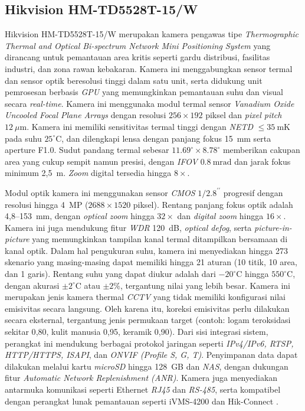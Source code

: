 \subsection{Hikvision HM-TD5528T-15/W}
Hikvision HM-TD5528T-15/W merupakan kamera pengawas tipe \emph{Thermographic Thermal and Optical Bi-spectrum Network Mini Positioning System} yang dirancang untuk pemantauan area kritis seperti gardu distribusi, fasilitas industri, dan zona rawan kebakaran. Kamera ini menggabungkan sensor termal dan sensor optik beresolusi tinggi dalam satu unit, serta didukung unit pemrosesan berbasis \emph{GPU} yang memungkinkan pemantauan suhu dan visual secara \emph{real-time}. Kamera ini menggunaka modul termal sensor \emph{Vanadium Oxide Uncooled Focal Plane Arrays} dengan resolusi \(256 \times 192\) piksel dan \emph{pixel pitch} \(12~\mu\text{m}\). Kamera ini memiliki sensitivitas termal tinggi dengan \emph{NETD} \(\leq 35~\text{mK}\) pada suhu \(25^\circ\text{C}\), dan dilengkapi lensa dengan panjang fokus 15~mm serta aperture F1.0. Sudut pandang termal sebesar \(11.69^\circ \times 8.78^\circ\) memberikan cakupan area yang cukup sempit namun presisi, dengan \emph{IFOV} \(0.8~\text{mrad}\) dan jarak fokus minimum 2{,}5~m. \emph{Zoom} digital tersedia hingga \(8 \times\).

Modul optik kamera ini menggunakan sensor \emph{CMOS} \(1/2.8^{\prime\prime}\) progresif dengan resolusi hingga 4~MP (\(2688 \times 1520\) piksel). Rentang panjang fokus optik adalah 4{,}8--153~mm, dengan \emph{optical zoom} hingga \(32 \times\) dan \emph{digital zoom} hingga \(16 \times\). Kamera ini juga mendukung fitur \emph{WDR} 120~dB, \emph{optical defog}, serta \emph{picture-in-picture} yang memungkinkan tampilan kanal termal ditampilkan bersamaan di kanal optik. Dalam hal pengukuran suhu, kamera ini menyediakan hingga 273 skenario yang masing-masing dapat memiliki hingga 21 aturan (10 titik, 10 area, dan 1 garis). Rentang suhu yang dapat diukur adalah dari \(-20^\circ\text{C}\) hingga \(550^\circ\text{C}\), dengan akurasi \(\pm 2^\circ\text{C}\) atau \(\pm 2\%\), tergantung nilai yang lebih besar. Kamera ini merupakan jenis kamera thermal \emph{CCTV} yang tidak memiliki konfigurasi nilai emisivitas secara langsung. Oleh karena itu, koreksi emisivitas perlu dilakukan secara eksternal, tergantung jenis permukaan target (contoh: logam teroksidasi sekitar 0{,}80, kulit manusia 0{,}95, keramik 0{,}90). Dari sisi integrasi sistem, perangkat ini mendukung berbagai protokol jaringan seperti \emph{IPv4/IPv6, RTSP, HTTP/HTTPS, ISAPI}, dan \emph{ONVIF (Profile S, G, T)}. Penyimpanan data dapat dilakukan melalui kartu \emph{microSD} hingga 128~GB dan \emph{NAS}, dengan dukungan fitur \emph{Automatic Network Replenishment (ANR)}. Kamera juga menyediakan antarmuka komunikasi seperti Ethernet \emph{RJ45} dan \emph{RS-485}, serta kompatibel dengan perangkat lunak pemantauan seperti iVMS-4200 dan Hik-Connect \cite{hikmicro_hmptz}.


